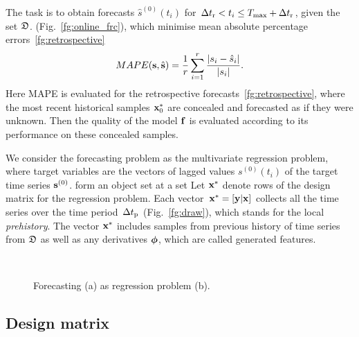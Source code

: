\documentclass[conference]{IEEEtran}
\begin{document}
 The task is to obtain forecasts $\hat{s}^{(0)}(t_i)$ for  $\Delta t_\text{r} <  t_i \leq T_{\max} + \Delta t_\text{r}$, given the set  ${\mathfrak{D}}$. (Fig.~\ref{fg:online_frc}), which minimise mean absolute percentage errors~\ref{fg:retrospective} 
 \[ MAPE({\mathbf{s}}, \hat{{\mathbf{s}}}) = \frac{1}{r}\sum_{i = 1}^{r} \frac{|s_i - \hat{s}_i|}{|s_i|}. \]
Here MAPE is evaluated for the retrospective forecasts~\ref{fg:retrospective}, where the most recent historical samples ${\mathbf{x}}_0^{*}$ are concealed and forecasted as if they were unknown. Then the quality of the model ${\mathbf{f}}$ is evaluated according to its performance on these concealed samples.
 
 
 We consider the forecasting problem as the multivariate regression problem, where target variables are the vectors of lagged values $s^{(0)}(t_i)$ of the target time series ${\mathbf{s}}^{(0)}$. form an object set at a set Let ${\mathbf{x}}^{*}$ denote rows of the design matrix for the regression problem. Each vector~${\mathbf{x}}^{*} = [{\mathbf{y}}| {\mathbf{x}}]$ collects all the time series over the time period~$\Delta t_\text{p}$ (Fig.~\ref{fg:draw}), which stands for the local \emph{prehistory}. The vector ${\mathbf{x}}^{*}$ includes samples from previous history of time series from ${\mathfrak{D}}$ as well as any derivatives ${\boldsymbol{\phi}}$, which are called generated features.
 


\begin{figure}[!ht]
\centering
{} \\
\centering {}
\caption{Forecasting (a) as regression problem (b).}
\end{figure}

\subsection{Design matrix}
\end{document}
